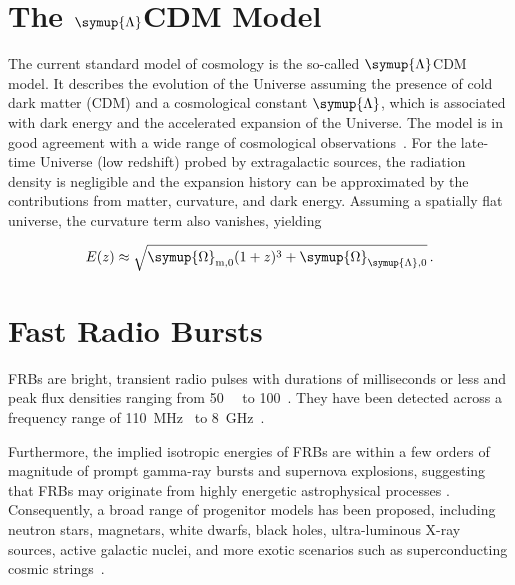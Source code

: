 \section{\texorpdfstring{The $\symup{\Lambda}$CDM Model}{The Lambda CDM Model}} \label{sec:lcdm_model}
The current standard model of cosmology is the so-called $\symup{\Lambda}$CDM model. 
It describes the evolution of the Universe assuming the presence of cold dark 
matter (CDM) and a cosmological constant $\symup{\Lambda}$, which is associated with 
dark energy and the accelerated expansion of the Universe. The model is in good 
agreement with a wide range of cosmological observations~\cite{PeeblesRatra_2003}.
For the late-time Universe (low redshift) probed by extragalactic sources, the radiation density 
is negligible and the expansion history can be approximated by the contributions from matter, 
curvature, and dark energy. Assuming a spatially flat universe, the curvature term also vanishes, yielding~\cite{Gong_2011} 

\begin{equation}
    E(z)\approx
    \sqrt{
    \symup{\Omega}_{\mathrm{m},0}(1+z)^3+
    \symup{\Omega}_{\symup{\Lambda},0}
    } \,.
\end{equation}

\section{Fast Radio Bursts} \label{sec:fast_radio_bursts}
FRBs are bright, transient radio pulses with durations of milliseconds or less and peak 
flux densities ranging from \qty{50}{\milli\jansky} to \qty{100}{\jansky}~\cite{Petroff_2019}.
They have been detected across a frequency range of \qty{110}{\mega\hertz}~\cite{Pleunis_2021}
to \qty{8}{\giga\hertz}~\cite{Zhang_2018}.

%
%

Furthermore, the implied isotropic energies of FRBs are within a few orders of magnitude of prompt gamma-ray bursts 
and supernova explosions, suggesting that FRBs may originate from highly energetic astrophysical processes 
\cite{Petroff_2019,Zhang_2021}. 
Consequently, a broad range of progenitor models has been proposed, 
including neutron stars, magnetars, white dwarfs, black holes,
ultra-luminous X-ray sources, active galactic nuclei, and more exotic scenarios such as superconducting cosmic strings~\cite{Petroff_2022}.

